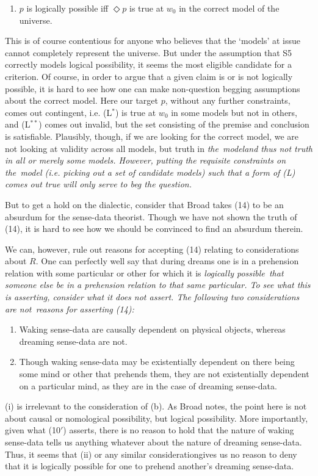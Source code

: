 \begin{enumerate}
\item[(S$_3$)] $p$ is logically possible iff $\Diamond p$ is true at $w_0$ in the correct model of the universe.
\end{enumerate}
This is of course contentious for anyone who believes that the `models' at issue cannot completely represent the universe. But under the assumption that \textsf{S5} correctly models logical possibility, it seems the most eligible candidate for a criterion. Of course, in order to argue that a given claim is or is not logically possible, it is hard to see how one can make non-question begging assumptions about the correct model. Here our target $p$, without any further constraints, comes out contingent, i.e. (L$^*$) is true at $w_0$ in some models but not in others, and (L$^{**}$) comes out invalid, but the set consisting of the premise and conclusion is satisfiable. Plausibly, though, if we are looking for the correct model, we are not looking at validity across all models, but truth in \em the\em\ model\textemdash and thus not truth in all or merely some models. However, putting the requisite constraints on \em the\em\ model (i.e. picking out a set of candidate models) such that a form of (L) comes out true will only serve to beg the question.

But to get a hold on the dialectic, consider that Broad takes (14) to be an absurdum for the sense-data theorist. Though we have not shown the truth of (14), it is hard to see how we should be convinced to find an absurdum therein.

We can, however, rule out reasons for accepting (14) relating to considerations about $R$. One can perfectly well say that during dreams one is in a prehension relation with some particular or other for which it is \em logically possible\em\ that someone else be in a prehension relation to that same particular. To see what this is asserting, consider what it does not assert. The following two considerations are \em not\em\ reasons for asserting (14):
\begin{enumerate}

\item[(i)]Waking sense-data are causally dependent on physical objects, whereas dreaming sense-data are not.
\item[(ii)]Though waking sense-data may be existentially dependent on there being some mind or other that prehends them, they are not existentially dependent on a particular mind, as they are in the case of dreaming sense-data. 

\end{enumerate}
(i) is irrelevant to the consideration of (b). As Broad notes, the point here is not about causal or nomological possibility, but logical possibility. More importantly, given what (10$'$) asserts, there is no reason to hold that the nature of waking sense-data tells us anything whatever about the nature of dreaming sense-data. Thus, it seems that (ii)
\textemdash or any similar consideration\textemdash gives us no reason to deny that it is logically possible for one to prehend another's dreaming sense-data. 

